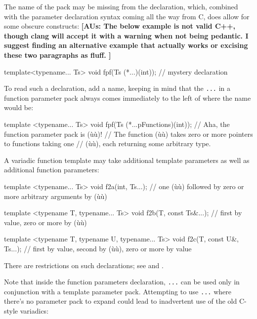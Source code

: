 The name of the pack may be missing from the declaration, which,
combined with the parameter declaration syntax coming all the way from
C, does allow for some obscure constructs:  \textbf{[AUs: The below example is not valid C++, though clang will accept it with a warning when not being pedantic. I suggest finding an alternative example that actually works or excising these two paragraphs as fluff.  ]}

\begin{emcppslisting}[emcppsignore={Need to figure this one out}]
template<typename... Ts> void fpf(Ts (*...)(int));
    // mystery declaration
\end{emcppslisting}
    

\noindent To read such a declaration, add a name, keeping in mind that the
\lstinline!...! in a function parameter pack always comes immediately to
the left of where the name would be:

\begin{emcppslisting}
template <typename... Ts> void fpf(Ts (*...pFunctions)(int));
    // Aha, the function parameter pack is (ù{}ù)!
    // The function (ù{}ù) takes zero or more pointers to functions taking one
    // (ù{}ù), each returning some arbitrary type.
\end{emcppslisting}
    

\noindent A variadic function template may take additional template parameters as
well as additional function parameters:

\begin{emcppslisting}
template <typename... Ts> void f2a(int, Ts...);
    // one (ù{}ù) followed by zero or more arbitrary arguments by (ù{}ù)

template <typename T, typename... Ts> void f2b(T, const Ts&...);
    // first by value, zero or more by (ù{}ù)

template <typename T, typename U, typename... Ts> void f2c(T, const U&, Ts...);
    // first by value, second by (ù{}ù), zero or more by value
\end{emcppslisting}
    

\noindent There are restrictions on such declarations; see  and .

Note that inside the function parameters declaration, \lstinline!...! can
be used only in conjunction with a template parameter pack. Attempting
to use \lstinline!...! where there's no parameter pack to expand could lead
to inadvertent use of the old C-style variadics:

